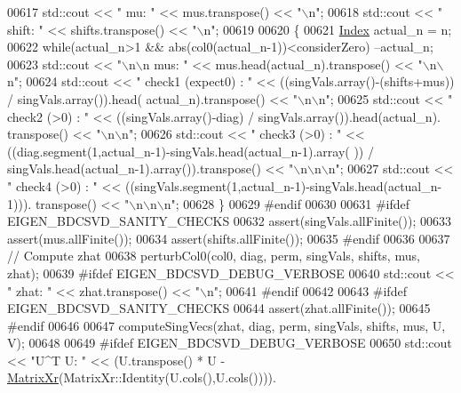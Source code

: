 \begin{DoxyCode}
00617   std::cout << \textcolor{stringliteral}{"  mu:       "} << mus.transpose() << \textcolor{stringliteral}{"\(\backslash\)n"};
00618   std::cout << \textcolor{stringliteral}{"  shift:    "} << shifts.transpose() << \textcolor{stringliteral}{"\(\backslash\)n"};
00619   
00620   \{
00621     \hyperlink{namespace_eigen_a62e77e0933482dafde8fe197d9a2cfde}{Index} actual\_n = n;
00622     \textcolor{keywordflow}{while}(actual\_n>1 && abs(col0(actual\_n-1))<considerZero) --actual\_n;
00623     std::cout << \textcolor{stringliteral}{"\(\backslash\)n\(\backslash\)n    mus:    "} << mus.head(actual\_n).transpose() << \textcolor{stringliteral}{"\(\backslash\)n\(\backslash\)n"};
00624     std::cout << \textcolor{stringliteral}{"    check1 (expect0) : "} << ((singVals.array()-(shifts+mus)) / singVals.array()).head(
      actual\_n).transpose() << \textcolor{stringliteral}{"\(\backslash\)n\(\backslash\)n"};
00625     std::cout << \textcolor{stringliteral}{"    check2 (>0)      : "} << ((singVals.array()-diag) / singVals.array()).head(actual\_n).
      transpose() << \textcolor{stringliteral}{"\(\backslash\)n\(\backslash\)n"};
00626     std::cout << \textcolor{stringliteral}{"    check3 (>0)      : "} << ((diag.segment(1,actual\_n-1)-singVals.head(actual\_n-1).array(
      )) / singVals.head(actual\_n-1).array()).transpose() << \textcolor{stringliteral}{"\(\backslash\)n\(\backslash\)n\(\backslash\)n"};
00627     std::cout << \textcolor{stringliteral}{"    check4 (>0)      : "} << ((singVals.segment(1,actual\_n-1)-singVals.head(actual\_n-1))).
      transpose() << \textcolor{stringliteral}{"\(\backslash\)n\(\backslash\)n\(\backslash\)n"};
00628   \}
00629 \textcolor{preprocessor}{#endif}
00630   
00631 \textcolor{preprocessor}{#ifdef EIGEN\_BDCSVD\_SANITY\_CHECKS}
00632   assert(singVals.allFinite());
00633   assert(mus.allFinite());
00634   assert(shifts.allFinite());
00635 \textcolor{preprocessor}{#endif}
00636   
00637   \textcolor{comment}{// Compute zhat}
00638   perturbCol0(col0, diag, perm, singVals, shifts, mus, zhat);
00639 \textcolor{preprocessor}{#ifdef  EIGEN\_BDCSVD\_DEBUG\_VERBOSE}
00640   std::cout << \textcolor{stringliteral}{"  zhat: "} << zhat.transpose() << \textcolor{stringliteral}{"\(\backslash\)n"};
00641 \textcolor{preprocessor}{#endif}
00642   
00643 \textcolor{preprocessor}{#ifdef EIGEN\_BDCSVD\_SANITY\_CHECKS}
00644   assert(zhat.allFinite());
00645 \textcolor{preprocessor}{#endif}
00646   
00647   computeSingVecs(zhat, diag, perm, singVals, shifts, mus, U, V);
00648   
00649 \textcolor{preprocessor}{#ifdef  EIGEN\_BDCSVD\_DEBUG\_VERBOSE}
00650   std::cout << \textcolor{stringliteral}{"U^T U: "} << (U.transpose() * U - \hyperlink{group___core___module}{MatrixXr}(MatrixXr::Identity(U.cols(),U.cols()))).

\end{DoxyCode}
